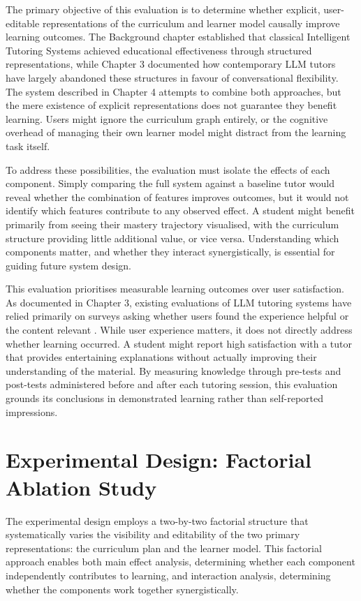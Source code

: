 \documentclass[logo,bsc,singlespacing,parskip,online]{infthesis}
\begin{document}
The primary objective of this evaluation is to determine whether explicit, user-editable representations of the curriculum and learner model causally improve learning outcomes. The Background chapter established that classical Intelligent Tutoring Systems achieved educational effectiveness through structured representations, while Chapter 3 documented how contemporary LLM tutors have largely abandoned these structures in favour of conversational flexibility. The system described in Chapter 4 attempts to combine both approaches, but the mere existence of explicit representations does not guarantee they benefit learning. Users might ignore the curriculum graph entirely, or the cognitive overhead of managing their own learner model might distract from the learning task itself.

To address these possibilities, the evaluation must isolate the effects of each component. Simply comparing the full system against a baseline tutor would reveal whether the combination of features improves outcomes, but it would not identify which features contribute to any observed effect. A student might benefit primarily from seeing their mastery trajectory visualised, with the curriculum structure providing little additional value, or vice versa. Understanding which components matter, and whether they interact synergistically, is essential for guiding future system design.

This evaluation prioritises measurable learning outcomes over user satisfaction. As documented in Chapter 3, existing evaluations of LLM tutoring systems have relied primarily on surveys asking whether users found the experience helpful or the content relevant \citep{chen2024chattutor}. While user experience matters, it does not directly address whether learning occurred. A student might report high satisfaction with a tutor that provides entertaining explanations without actually improving their understanding of the material. By measuring knowledge through pre-tests and post-tests administered before and after each tutoring session, this evaluation grounds its conclusions in demonstrated learning rather than self-reported impressions.

\section{Experimental Design: Factorial Ablation Study}
\label{sec:experimental-design}

The experimental design employs a two-by-two factorial structure that systematically varies the visibility and editability of the two primary representations: the curriculum plan and the learner model. This factorial approach enables both main effect analysis, determining whether each component independently contributes to learning, and interaction analysis, determining whether the components work together synergistically.
\end{document}
